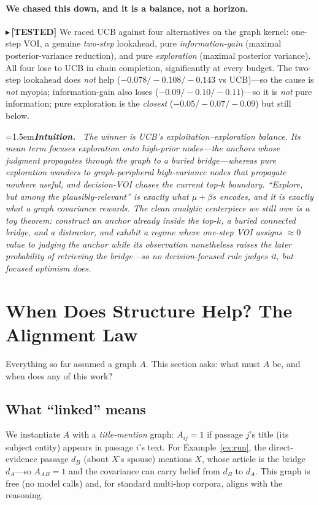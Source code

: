 \documentclass[11pt]{article}
\newcommand{\TESTED}[1]{{\color{teal}\small$\blacktriangleright$\,\textbf{[TESTED]} #1}}
\newenvironment{intuition}{\par\smallskip\noindent\hangindent=1.5em\textbf{\itshape Intuition.}\itshape\ \ignorespaces}{\par\smallskip}
\begin{document}
\paragraph{We chased this down, and it is a balance, not a horizon.}
\TESTED{We raced UCB against four alternatives on the graph kernel: one-step VOI, a genuine \emph{two-step}
lookahead, pure \emph{information-gain} (maximal posterior-variance reduction), and pure \emph{exploration}
(maximal posterior variance). All four lose to UCB in chain completion, significantly at every budget. The
two-step lookahead does \emph{not} help ($-0.078/-0.108/-0.143$ vs UCB)---so the cause is \emph{not} myopia;
information-gain also loses ($-0.09/-0.10/-0.11$)---so it is \emph{not} pure information; pure exploration is the
\emph{closest} ($-0.05/-0.07/-0.09$) but still below.}
\begin{intuition}
The winner is UCB's exploitation--exploration \emph{balance}. Its mean term \emph{focuses} exploration onto
high-prior nodes---the anchors whose judgment propagates through the graph to a buried bridge---whereas pure
exploration wanders to graph-\emph{peripheral} high-variance nodes that propagate nowhere useful, and
decision-VOI chases the current top-$k$ boundary. ``Explore, but among the plausibly-relevant'' is exactly what
$\mu+\beta s$ encodes, and it is exactly what a graph covariance rewards. The clean analytic centerpiece we still
owe is a toy theorem: construct an anchor already inside the top-$k$, a buried connected bridge, and a distractor,
and exhibit a regime where one-step VOI assigns $\approx0$ value to judging the anchor while its observation
nonetheless raises the later probability of retrieving the bridge---so \emph{no} decision-focused rule judges it,
but focused optimism does.
\end{intuition}

\section{When Does Structure Help? The Alignment Law}\label{sec:law}
Everything so far assumed a graph $A$. This section asks: what must $A$ be, and when does any of this work?

\subsection{What ``linked'' means}
We instantiate $A$ with a \emph{title-mention} graph: $A_{ij}=1$ if passage $j$'s title (its subject entity)
appears in passage $i$'s text. For Example~\ref{ex:run}, the direct-evidence passage $d_B$ (about $X$'s spouse)
mentions $X$, whose article is the bridge $d_A$---so $A_{AB}=1$ and the covariance can carry belief from $d_B$
to $d_A$. This graph is free (no model calls) and, for standard multi-hop corpora, aligns with the reasoning.
\end{document}
